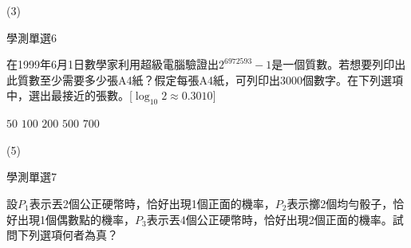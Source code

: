 \begin{QUESTIONS}
\begin{QUESTION}
        \begin{QANS}
			(3)
        \end{QANS}
        \begin{QSOLLIST}
        \end{QSOLLIST}
        \begin{QEMPTYSPACE}
        \end{QEMPTYSPACE}
    \end{QUESTION}
    \begin{QUESTION}
        \begin{ExamInfo}{89}{學測}{單選}{6}
        \end{ExamInfo}
        \begin{ExamAnsRateInfo}{}{}{}{}
        \end{ExamAnsRateInfo}
        \begin{QBODY}
		在1999年6月1日數學家利用超級電腦驗證出${{2}^{6972593}}-1$是一個質數。若想要列印出此質數至少需要多少張A4紙？假定每張A4紙，可列印出3000個數字。在下列選項中，選出最接近的張數。[${{\log }_{10}}2\approx 0.3010$]
		\begin{QOPS}
			\QOP $ 50  $
			\QOP $ 100 $
			\QOP $ 200 $
			\QOP $ 500 $
			\QOP $ 700 $
		\end{QOPS}
        \end{QBODY}
        \begin{QFROMS}
        \end{QFROMS}
        \begin{QTAGS}\end{QTAGS}
        \begin{QANS}
			(5)
        \end{QANS}
        \begin{QSOLLIST}
        \end{QSOLLIST}
        \begin{QEMPTYSPACE}
        \end{QEMPTYSPACE}
    \end{QUESTION}
    \begin{QUESTION}
        \begin{ExamInfo}{89}{學測}{單選}{7}
        \end{ExamInfo}
        \begin{ExamAnsRateInfo}{}{}{}{}
        \end{ExamAnsRateInfo}
        \begin{QBODY}
			設$P_1$表示丟2個公正硬幣時，恰好出現1個正面的機率，$P_2$表示擲2個均勻骰子，恰好出現1個偶數點的機率，$P_3$表示丟4個公正硬幣時，恰好出現2個正面的機率。試問下列選項何者為真？

\end{QBODY}
\end{QUESTION}
\end{QUESTIONS}
